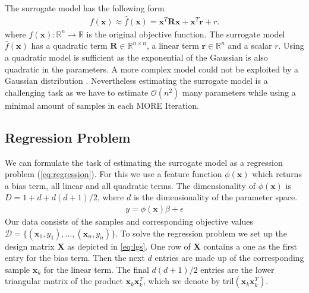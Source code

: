The surrogate model has the following form
\begin{align*}
  f(\mathbf{x}) \approx \hat{f}(\mathbf{x}) =
  \mathbf{x}^T \mathbf{R} \mathbf{x}
  + \mathbf{x}^T \mathbf{r} + r.
\end{align*}
where $f(\mathbf{x}) : \mathbb{R}^n \rightarrow \mathbb{R}$
is the original objective function.
The surrogate model $\hat{f}(\mathbf{x})$
has a quadratic term $\mathbf{R} \in \mathbb{R}^{n \times n}$,
a linear term $\mathbf{r} \in \mathbb{R}^{n}$ and a scalar $r$.
Using a quadratic model is sufficient as the exponential of the
Gaussian is also quadratic in the parameters.
A more complex model could not be exploited by
a Gaussian distribution \citep{abdolmaleki2015model}.
Nevertheless estimating the surrogate model is a challenging task as we
have to estimate $\mathcal{O}(n^2)$ many parameters while using a minimal
amount of samples in each MORE Iteration.



\subsection{Regression Problem}
We can formulate the task of estimating the surrogate model as
a regression problem (\ref{eq:regression}). For this we use
a feature function $\phi(\mathbf{x})$ which returns
a bias term, all linear and all quadratic terms. The dimensionality of
$\phi(\mathbf{x})$ is $D = 1 + d + d(d + 1) / 2$, where $d$
is the dimensionality of the parameter space.
\begin{align}
  \label{eq:regression}
  y = \phi(\mathbf{x}) \beta + \epsilon
\end{align}
Our data consists of the samples and corresponding objective
values $\mathcal{D} = \{(\mathbf{x}_1, y_1),\dots,(\mathbf{x}_n, y_n)\}$.
To solve the regression problem we set up
the design matrix $\mathbf{X}$ as depicted in \cref{eq:lgs}.
One row of $\mathbf{X}$ contains a one as the first entry for the bias term.
Then the next $d$ entries are made up of the corresponding
sample $\mathbf{x}_k$ for the linear term.
The final $d(d + 1) / 2$  entries are
the lower triangular matrix of the product $\mathbf{x}_k \mathbf{x}_k^T$,
which we denote by tril$(\mathbf{x}_k \mathbf{x}_k^T)$.

